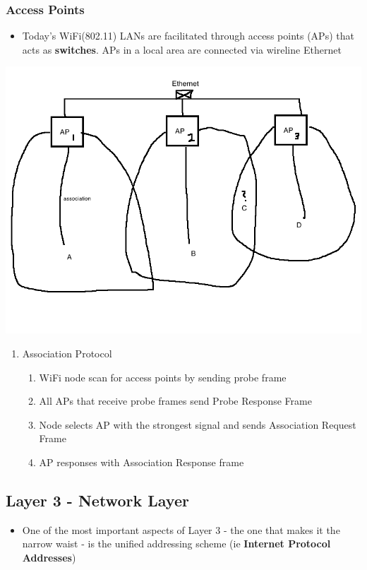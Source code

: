 \documentclass[11pt]{article}
\begin{document}
\subsubsection{Access Points}
\label{sec:orgheadline50}
\begin{itemize}
\item Today's WiFi(802.11) LANs are facilitated through access points
(APs) that acts as \textbf{switches}. APs in a local area are connected via
wireline Ethernet
\end{itemize}
\includegraphics[width=.9\linewidth]{diagrams/accesspoint.png}
\begin{enumerate}
\item Association Protocol
\label{sec:orgheadline49}
\begin{enumerate}
\item WiFi node scan for access points by sending probe frame
\item All APs that receive probe frames send Probe Response Frame
\item Node selects AP with the strongest signal and sends Association
Request Frame
\item AP responses with Association Response frame
\end{enumerate}
\end{enumerate}

\subsection{Layer 3 - Network Layer}
\label{sec:orgheadline52}
\begin{itemize}
\item One of the most important aspects of Layer 3 - the one that makes it
the narrow waist - is the unified addressing scheme (ie \textbf{Internet
Protocol Addresses})
\end{itemize}
\end{document}
